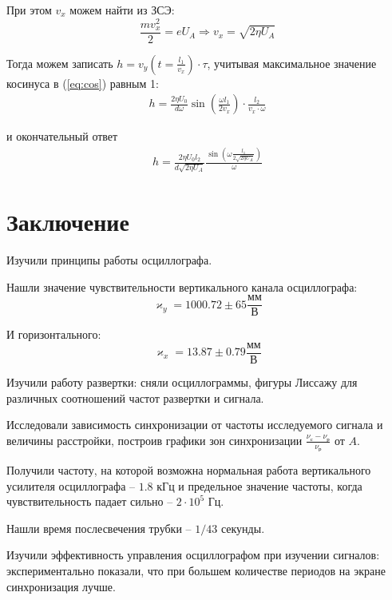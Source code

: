 При этом $v_x$ можем найти из ЗСЭ:
\begin{equation}
	\frac{mv^2_x}{2}=eU_A\Longrightarrow v_x=\sqrt{2\eta{U_A}}
\end{equation}

Тогда можем записать $h=v_y(t=\frac{l_1}{v_x})\cdot\tau$, учитывая максимальное значение косинуса в (\ref{eq:cos}) равным 1:
\begin{gather}
	h=\frac{2\eta{U_0}}{d\omega}\sin\left(\frac{\omega{l_1}}{2v_x}\right)\cdot\frac{l_2}{v_x\cdot\omega}
\end{gather}

и окончательный ответ
\begin{gather}
	h=\frac{2\eta{U_0}l_2}{d\sqrt{2\eta{U_A}}}\frac{\sin\left(\omega\frac{{l_1}}{2\sqrt{2\eta{U_A}}}\right)}{\omega}
\end{gather}





\newpage
\section*{Заключение}


Изучили принципы работы осциллографа.

Нашли значение чувствительности вертикального канала осциллографа:
\begin{equation}
	\varkappa_y=1000.72\pm65 \frac{\text{мм}}{\text{В}}
\end{equation}

И горизонтального:
\begin{equation}
	\varkappa_x=13.87\pm0.79 \frac{\text{мм}}{\text{В}}
\end{equation}

Изучили работу развертки: сняли осциллограммы, фигуры Лиссажу 
 для различных соотношений частот развертки и сигнала.

Исследовали зависимость синхронизации от частоты исследуемого сигнала и величины расстройки, построив графики зон синхронизации $\frac{\nu_\text{с}-\nu_\text{р}}{\nu_\text{р}}$ от $A$.

Получили частоту, на которой возможна нормальная работа вертикального усилителя осциллографа -- $1.8$ кГц и предельное значение частоты, когда чувствительность падает сильно -- $2\cdot10^5$ Гц.

Нашли время послесвечения трубки -- $1/43$ секунды.

Изучили эффективность управления осциллографом при изучении сигналов: 
 экспериментально показали, что при большем количестве периодов на экране синхронизация лучше.


